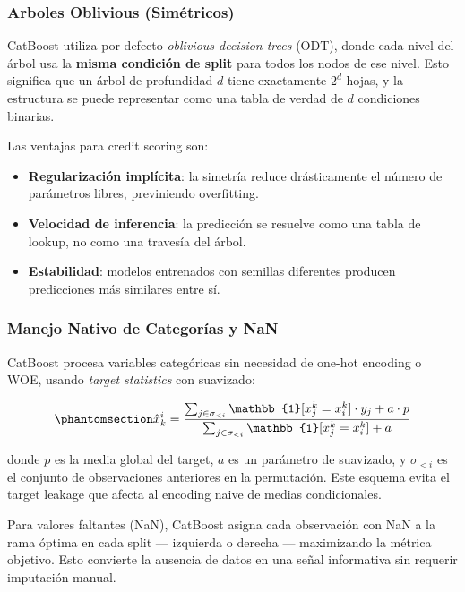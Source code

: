 \documentclass[
  spanish,
  11pt,
  letterpaper,
]{scrbook}
\providecommand{\tightlist}{%
  \setlength{\itemsep}{0pt}\setlength{\parskip}{0pt}}
\theoremstyle{plain}
\theoremstyle{remark}
\begin{document}
\subsubsection{Arboles Oblivious
(Simétricos)}\label{arboles-oblivious-simuxe9tricos}

CatBoost utiliza por defecto \emph{oblivious decision trees} (ODT),
donde cada nivel del árbol usa la \textbf{misma condición de split} para
todos los nodos de ese nivel. Esto significa que un árbol de profundidad
\(d\) tiene exactamente \(2^d\) hojas, y la estructura se puede
representar como una tabla de verdad de \(d\) condiciones binarias.

Las ventajas para credit scoring son:

\begin{itemize}
\tightlist
\item
  \textbf{Regularización implícita}: la simetría reduce drásticamente el
  número de parámetros libres, previniendo overfitting.
\item
  \textbf{Velocidad de inferencia}: la predicción se resuelve como una
  tabla de lookup, no como una travesía del árbol.
\item
  \textbf{Estabilidad}: modelos entrenados con semillas diferentes
  producen predicciones más similares entre sí.
\end{itemize}

\subsubsection{Manejo Nativo de Categorías y
NaN}\label{manejo-nativo-de-categoruxedas-y-nan}

CatBoost procesa variables categóricas sin necesidad de one-hot encoding
o WOE, usando \emph{target statistics} con suavizado:

\begin{equation}\protect\phantomsection\label{eq-target-statistics}{
\hat{x}_k^i = \frac{\sum_{j \in \sigma_{<i}} \mathbb{1}[x_j^k = x_i^k] \cdot y_j + a \cdot p}{\sum_{j \in \sigma_{<i}} \mathbb{1}[x_j^k = x_i^k] + a}
}\end{equation}

donde \(p\) es la media global del target, \(a\) es un parámetro de
suavizado, y \(\sigma_{<i}\) es el conjunto de observaciones anteriores
en la permutación. Este esquema evita el target leakage que afecta al
encoding naive de medias condicionales.

Para valores faltantes (NaN), CatBoost asigna cada observación con NaN a
la rama óptima en cada split --- izquierda o derecha --- maximizando la
métrica objetivo. Esto convierte la ausencia de datos en una señal
informativa sin requerir imputación manual.
\end{document}
